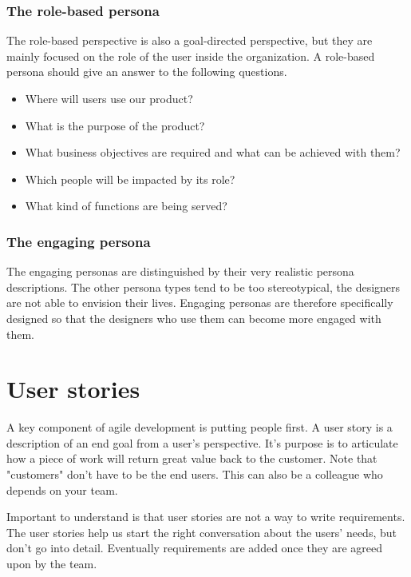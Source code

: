     \subsubsection{The role-based persona}
    The role-based perspective is also a goal-directed perspective, but they are mainly focused on the role of the user inside the organization. A role-based persona should give an answer to the following questions.
    \begin{itemize}
        \setlength\itemsep{-2pt} 
        \item{Where will users use our product?}
        \item{What is the purpose of the product?}
        \item{What business objectives are required and what can be achieved with them?}
        \item{Which people will be impacted by its role?}
        \item{What kind of functions are being served?}
    \end{itemize}
    
    \subsubsection{The engaging persona}
    
    The engaging personas are distinguished by their very realistic persona descriptions. The other persona types tend to be too stereotypical, the designers are not able to envision their lives. Engaging personas are therefore specifically designed so that the designers who use them can become more engaged with them.
    
    \section{User stories}
    A key component of agile development is putting people first. A user story is a description of an end goal from a user's perspective. It's purpose is to articulate how a piece of work will return great value back to the customer. Note that "customers" don't have to be the end users. This can also be a colleague who depends on your team.
    
    Important to understand is that user stories are not a way to write requirements. The user stories help us start the right conversation about the users' needs, but don't go into detail. Eventually requirements are added once they are agreed upon by the team.
    
